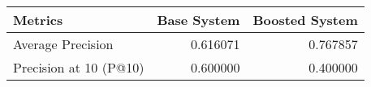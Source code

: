 \begin{tabular}{lrr}
\toprule
Metrics & Base System & Boosted System \\
\midrule
Average Precision & 0.616071 & 0.767857 \\
Precision at 10 (P@10) & 0.600000 & 0.400000 \\
\bottomrule
\end{tabular}
